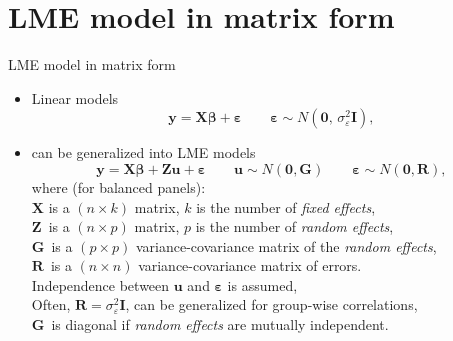 \documentclass{beamer}
\begin{document}
\section{LME model in matrix form}
\begin{frame}{LME model in matrix form}
\begin{itemize}
\item Linear models 
$$\bm{y} = \bm{X \beta} + \bm{\varepsilon} 
\qquad \bm{\varepsilon} \sim N(\bm{0}, \,\sigma^2_{\varepsilon} \bm{I}),$$

\item can be generalized into LME models
$$\bm{y} = \bm{X \beta} + \bm{Z u} + \bm{\varepsilon} 
\qquad \bm{u} \sim N(\bm{0}, \bm{G})
\qquad \bm{\varepsilon} \sim N(\bm{0}, \bm{R}),$$
where (for balanced panels):\\
$\bm{X}$ is a $(n \! \times \! k)$ matrix, $k$ is the number of \textit{fixed effects},\\
$\bm{Z}\,$ is a $(n \! \times \! p)$ matrix, $p$ is the number of \textit{random effects},\\
$\bm{G}\,$ is a $(p \! \times \! p)$ variance-covariance matrix of the \textit{random effects},\\
$\bm{R}\,$ is a $(n \! \times \! n)$ variance-covariance matrix of errors.\\
\medskip
Independence between $\bm{u}$ and $\bm{\varepsilon}$ is assumed,\\
Often, $\bm{R}=\sigma^2_{\varepsilon} \bm{I}$, can be generalized for group-wise correlations,\\
$\bm{G}\,$ is diagonal if \textit{random effects} are mutually independent.
\end{itemize}
\end{frame}
\end{document}
